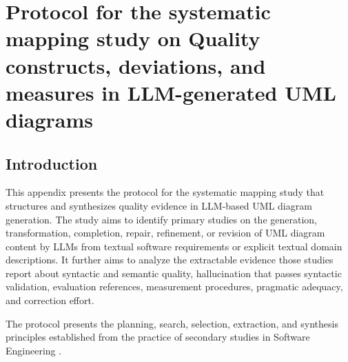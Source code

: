 %

\providecommand{\protocolfield}[1]{\textbf{[#1]}}
\providecommand{\yes}{\textit{Yes}}
\providecommand{\partial}{\textit{Partially}}
\providecommand{\no}{\textit{No}}
\newcommand{\reviewtitle}{Quality constructs, deviations, and measures in LLM-generated UML diagrams}

\chapter{Protocol for the systematic mapping study on \reviewtitle}
\label{app:quality_focused_mapping_protocol}

\section{Introduction}
\label{sec:protocol_identification}

This appendix presents the protocol for the systematic mapping study that structures and synthesizes quality evidence in LLM-based UML diagram generation. The study aims to identify primary studies on the generation, transformation, completion, repair, refinement, or revision of UML diagram content by LLMs from textual software requirements or explicit textual domain descriptions. It further aims to analyze the extractable evidence those studies report about syntactic and semantic quality, hallucination that passes syntactic validation, evaluation references, measurement procedures, pragmatic adequacy, and correction effort.

The protocol presents the planning, search, selection, extraction, and synthesis principles established from the practice of secondary studies in Software Engineering \cite{Kitchenham2007Guidelines,Brereton2007Lessons,Petersen2015Mapping,Zhang2011Identifying}.

